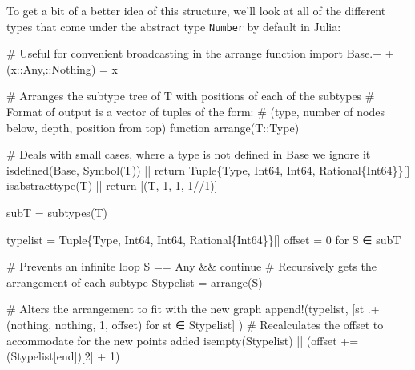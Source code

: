 \documentclass[
  letterpaper,
  DIV=11,
  numbers=noendperiod]{scrreprt}
\newenvironment{Shaded}{\begin{snugshade}}{\end{snugshade}}
\newcommand{\BuiltInTok}[1]{\textcolor[rgb]{0.00,0.23,0.31}{#1}}
\newcommand{\CommentTok}[1]{\textcolor[rgb]{0.37,0.37,0.37}{#1}}
\newcommand{\ConstantTok}[1]{\textcolor[rgb]{0.56,0.35,0.01}{#1}}
\newcommand{\ControlFlowTok}[1]{\textcolor[rgb]{0.00,0.23,0.31}{#1}}
\newcommand{\DataTypeTok}[1]{\textcolor[rgb]{0.68,0.00,0.00}{#1}}
\newcommand{\FloatTok}[1]{\textcolor[rgb]{0.68,0.00,0.00}{#1}}
\newcommand{\FunctionTok}[1]{\textcolor[rgb]{0.28,0.35,0.67}{#1}}
\newcommand{\ImportTok}[1]{\textcolor[rgb]{0.00,0.46,0.62}{#1}}
\newcommand{\KeywordTok}[1]{\textcolor[rgb]{0.00,0.23,0.31}{#1}}
\newcommand{\NormalTok}[1]{\textcolor[rgb]{0.00,0.23,0.31}{#1}}
\newcommand{\OperatorTok}[1]{\textcolor[rgb]{0.37,0.37,0.37}{#1}}
\begin{document}
To get a bit of a better idea of this structure, we'll look at all of
the different types that come under the abstract type \texttt{Number} by
default in Julia:

\begin{Shaded}
\begin{Highlighting}[]
\CommentTok{\# Useful for convenient broadcasting in the arrange function}
\ImportTok{import} \BuiltInTok{Base.+}
\FunctionTok{+}\NormalTok{(x}\OperatorTok{::}\DataTypeTok{Any}\NormalTok{,}\OperatorTok{::}\DataTypeTok{Nothing}\NormalTok{) }\OperatorTok{=}\NormalTok{ x}

\CommentTok{\# Arranges the subtype tree of T with positions of each of the subtypes}
\CommentTok{\# Format of output is a vector of tuples of the form:}
\CommentTok{\#     (type, number of nodes below, depth, position from top)}
\KeywordTok{function} \FunctionTok{arrange}\NormalTok{(T}\OperatorTok{::}\DataTypeTok{Type}\NormalTok{)}

    \CommentTok{\# Deals with small cases, where a type is not defined in Base we ignore it}
    \FunctionTok{isdefined}\NormalTok{(}\BuiltInTok{Base}\NormalTok{, }\FunctionTok{Symbol}\NormalTok{(T)) }\OperatorTok{||} \ControlFlowTok{return} \DataTypeTok{Tuple}\NormalTok{\{}\DataTypeTok{Type}\NormalTok{, }\DataTypeTok{Int64}\NormalTok{, }\DataTypeTok{Int64}\NormalTok{, }\DataTypeTok{Rational}\NormalTok{\{}\DataTypeTok{Int64}\NormalTok{\}\}[]}
    \FunctionTok{isabstracttype}\NormalTok{(T) }\OperatorTok{||} \ControlFlowTok{return}\NormalTok{ [(T, }\FloatTok{1}\NormalTok{, }\FloatTok{1}\NormalTok{, }\FloatTok{1}\OperatorTok{//}\FloatTok{1}\NormalTok{)]}

\NormalTok{    subT }\OperatorTok{=} \FunctionTok{subtypes}\NormalTok{(T)}
    
\NormalTok{    typelist }\OperatorTok{=} \DataTypeTok{Tuple}\NormalTok{\{}\DataTypeTok{Type}\NormalTok{, }\DataTypeTok{Int64}\NormalTok{, }\DataTypeTok{Int64}\NormalTok{, }\DataTypeTok{Rational}\NormalTok{\{}\DataTypeTok{Int64}\NormalTok{\}\}[]}
\NormalTok{    offset }\OperatorTok{=} \FloatTok{0}
    \ControlFlowTok{for}\NormalTok{ S }\OperatorTok{∈}\NormalTok{ subT}
        
        \CommentTok{\# Prevents an infinite loop}
\NormalTok{        S }\OperatorTok{==} \DataTypeTok{Any} \OperatorTok{\&\&} \ControlFlowTok{continue}
        \CommentTok{\# Recursively gets the arrangement of each subtype}
\NormalTok{        Stypelist }\OperatorTok{=} \FunctionTok{arrange}\NormalTok{(S)}

        \CommentTok{\# Alters the arrangement to fit with the new graph}
        \FunctionTok{append!}\NormalTok{(typelist,}
\NormalTok{            [st }\OperatorTok{.+}\NormalTok{ (}\ConstantTok{nothing}\NormalTok{, }\ConstantTok{nothing}\NormalTok{, }\FloatTok{1}\NormalTok{, offset) for st }\OperatorTok{∈}\NormalTok{ Stypelist]}
\NormalTok{        )}
        \CommentTok{\# Recalculates the offset to accommodate for the new points added}
        \FunctionTok{isempty}\NormalTok{(Stypelist) }\OperatorTok{||}\NormalTok{ (offset }\OperatorTok{+=}\NormalTok{ (Stypelist[}\KeywordTok{end}\NormalTok{])[}\FloatTok{2}\NormalTok{] }\OperatorTok{+} \FloatTok{1}\NormalTok{)}
        

\end{Highlighting}
\end{Shaded}
\end{document}
